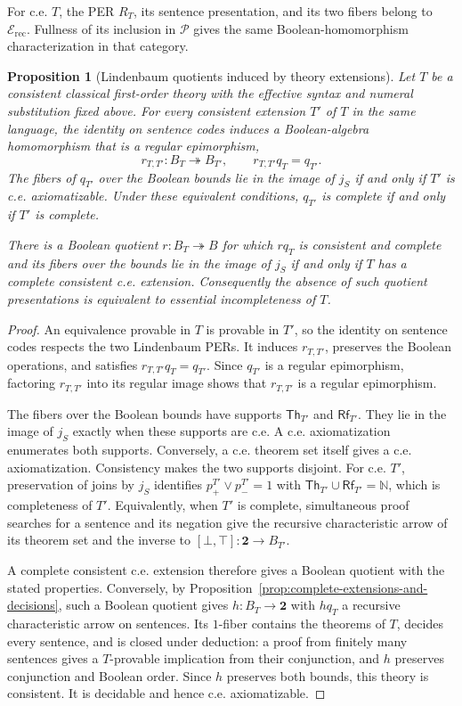 \documentclass[11pt]{article}
\newtheorem{proposition}[theorem]{Proposition}
\theoremstyle{definition}
\theoremstyle{remark}
\begin{document}
For c.e. $T$, the PER $R_T$, its sentence presentation, and its
two fibers belong to $\mathcal E_{\mathrm{rec}}$. Fullness of its
inclusion in $\mathcal P$ gives the same Boolean-homomorphism
characterization in that category.

\begin{proposition}[Lindenbaum quotients induced by theory extensions]
\label{prop:numerical-boolean-extensions}
Let $T$ be a consistent classical first-order theory with the
effective syntax and numeral substitution fixed above.
For every consistent extension $T'$ of $T$ in the same language,
the identity on sentence codes induces a Boolean-algebra homomorphism
that is a regular epimorphism,
\[
 r_{T,T'}:B_T\twoheadrightarrow B_{T'},\qquad
 r_{T,T'}q_T=q_{T'}.
\]
The fibers of $q_{T'}$ over the Boolean bounds lie in the image of $j_S$ if and
only if $T'$ is c.e. axiomatizable. Under these equivalent
conditions, $q_{T'}$ is complete if and only if $T'$ is complete.

There is a Boolean quotient $r:B_T\twoheadrightarrow B$ for
which $rq_T$ is consistent and complete and its fibers over the
bounds lie in the image of $j_S$ if and only if $T$ has a
complete consistent c.e. extension. Consequently the absence of
such quotient presentations is equivalent to essential incompleteness
of $T$.
\end{proposition}
\begin{proof}
An equivalence provable in $T$ is provable in $T'$, so the
identity on sentence codes respects the two Lindenbaum PERs.
It induces $r_{T,T'}$, preserves the Boolean operations, and
satisfies $r_{T,T'}q_T=q_{T'}$. Since $q_{T'}$ is a regular
epimorphism, factoring $r_{T,T'}$ into its regular image shows
that $r_{T,T'}$ is a regular epimorphism.

The fibers over the Boolean bounds have supports $\mathsf{Th}_{T'}$ and
$\mathsf{Rf}_{T'}$. They lie in the image of $j_S$ exactly when
these supports are c.e. A c.e. axiomatization enumerates both
supports. Conversely, a c.e. theorem set itself gives a c.e.
axiomatization. Consistency makes the two supports disjoint.
For c.e. $T'$, preservation of joins by $j_S$ identifies
$p^{T'}_+\vee p^{T'}_-=1$ with
$\mathsf{Th}_{T'}\cup\mathsf{Rf}_{T'}=\mathbb N$,
which is completeness of $T'$. Equivalently, when $T'$ is
complete, simultaneous proof searches for a sentence and its
negation give the recursive characteristic arrow of its theorem
set and the inverse to $[\bot,\top]:\mathbf2\to B_{T'}$.

A complete consistent c.e. extension therefore gives a Boolean quotient with the stated properties. Conversely, by
Proposition~\ref{prop:complete-extensions-and-decisions}, such a
Boolean quotient gives $h:B_T\to\mathbf2$ with $hq_T$ a
recursive characteristic arrow on sentences. Its $1$-fiber
contains the theorems of $T$, decides every sentence, and is
closed under deduction: a proof from finitely many sentences
gives a $T$-provable implication from their conjunction, and
$h$ preserves conjunction and Boolean order. Since $h$ preserves
both bounds, this theory is consistent. It is decidable and
hence c.e. axiomatizable.
\end{proof}
\end{document}
